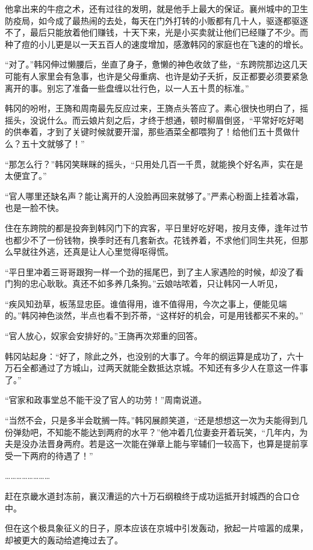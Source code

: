 他拿出来的牛痘之术，还有过往的发明，就是他手上最大的保证。襄州城中的卫生防疫局，如今成了最热闹的去处，每天在门外打转的小贩都有几十人，驱逐都驱逐不了，最后只能放着他们赚钱，十天下来，光是小买卖就让他们已经赚了不少。而种了痘的小儿更是以一天五百人的速度增加，感激韩冈的家庭也在飞速的的增长。

“对了。”韩冈伸过懒腰后，坐直了身子，惫懒的神色收敛了些，“东跨院那边这几天可能有人家里会有急事，也许是父母重病、也许是幼子夭折，反正都要必须要紧急离开的事。别忘了准备一些盘缠以壮行色，以一人五十贯的标准。”

韩冈的吩咐，王旖和周南最先反应过来，王旖点头答应了。素心很快也明白了，摇摇头，没说什么。而云娘片刻之后，才终于想通，顿时柳眉倒竖，“平常好吃好喝的供奉着，才到了关键时候就要开溜，那些酒菜全都喂狗了！给他们五十贯做什么？五十文就够了！”

“那怎么行？”韩冈笑眯眯的摇头，“只用处几百一千贯，就能换个好名声，实在是太便宜了。”

“官人哪里还缺名声？能让离开的人没脸再回来就够了。”严素心粉面上挂着冰霜，也是一脸不快。

住在东跨院的都是投奔到韩冈门下的宾客，平日里好吃好喝，按月支俸，逢年过节也都少不了一份钱物，换季时还有几套新衣。花钱养着，不求他们同生共死，但那么早就往外逃，还真是让人心里觉得呕得慌。

“平日里冲着三哥哥跟狗一样一个劲的摇尾巴，到了主人家遇险的时候，却没了看门狗的忠心耿耿。真还不如多养几条狗。”云娘咕哝着，只让韩冈一人听见，

“疾风知劲草，板荡显忠臣。谁值得用，谁不值得用，今次之事上，便能见端的。”韩冈神色淡然，半点也看不到芥蒂，“这样好的机会，可是用钱都买不来的。”

“官人放心，奴家会安排好的。”王旖再次郑重的回答。

韩冈站起身：“好了，除此之外，也没别的大事了。今年的纲运算是成功了，六十万石全都通过了方城山，过两天就能全数抵达京城。不知还有多少人在意这一件事了。”

“官家和政事堂总不能干没了官人的功劳！”周南说道。

“当然不会，只是多半会耽搁一阵。”韩冈展颜笑道，“还是想想这一次为夫能得到几份弹劾吧，不知能不能达到两府的水平？”他冲着几位妻妾开着玩笑，“几年内，为夫是没办法晋身两府。若是这一次能在弹章上能与宰辅们一较高下，也算是提前享受一下两府的待遇了！”

……………………

赶在京畿水道封冻前，襄汉漕运的六十万石纲粮终于成功运抵开封城西的合口仓中。

但在这个极具象征义的日子，原本应该在京城中引发轰动，掀起一片喧嚣的成果，却被更大的轰动给遮掩过去了。

